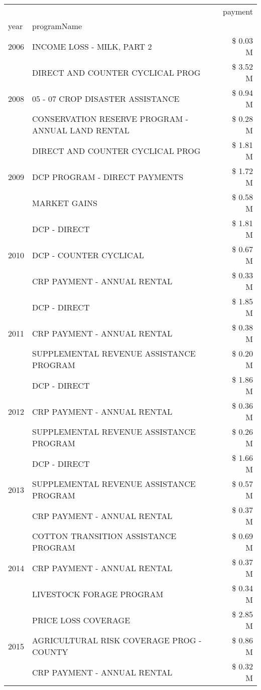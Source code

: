 \begin{tabular}{llr}
\toprule
 &  & payment \\
year & programName &  \\
\midrule
2006 & INCOME LOSS - MILK, PART 2 & \$ 0.03 M \\
\cline{1-3}
\multirow[t]{3}{*}{2008} & DIRECT AND COUNTER CYCLICAL PROG & \$ 3.52 M \\
 & 05 - 07 CROP DISASTER ASSISTANCE & \$ 0.94 M \\
 & CONSERVATION RESERVE PROGRAM - ANNUAL LAND RENTAL & \$ 0.28 M \\
\cline{1-3}
\multirow[t]{3}{*}{2009} & DIRECT AND COUNTER CYCLICAL PROG & \$ 1.81 M \\
 & DCP PROGRAM - DIRECT PAYMENTS & \$ 1.72 M \\
 & MARKET GAINS & \$ 0.58 M \\
\cline{1-3}
\multirow[t]{3}{*}{2010} & DCP - DIRECT & \$ 1.81 M \\
 & DCP - COUNTER CYCLICAL & \$ 0.67 M \\
 & CRP PAYMENT - ANNUAL RENTAL & \$ 0.33 M \\
\cline{1-3}
\multirow[t]{3}{*}{2011} & DCP - DIRECT & \$ 1.85 M \\
 & CRP PAYMENT - ANNUAL RENTAL & \$ 0.38 M \\
 & SUPPLEMENTAL REVENUE ASSISTANCE PROGRAM & \$ 0.20 M \\
\cline{1-3}
\multirow[t]{3}{*}{2012} & DCP - DIRECT & \$ 1.86 M \\
 & CRP PAYMENT - ANNUAL RENTAL & \$ 0.36 M \\
 & SUPPLEMENTAL REVENUE ASSISTANCE PROGRAM & \$ 0.26 M \\
\cline{1-3}
\multirow[t]{3}{*}{2013} & DCP - DIRECT & \$ 1.66 M \\
 & SUPPLEMENTAL REVENUE ASSISTANCE PROGRAM & \$ 0.57 M \\
 & CRP PAYMENT - ANNUAL RENTAL & \$ 0.37 M \\
\cline{1-3}
\multirow[t]{3}{*}{2014} & COTTON TRANSITION ASSISTANCE PROGRAM & \$ 0.69 M \\
 & CRP PAYMENT - ANNUAL RENTAL & \$ 0.37 M \\
 & LIVESTOCK FORAGE PROGRAM & \$ 0.34 M \\
\cline{1-3}
\multirow[t]{3}{*}{2015} & PRICE LOSS COVERAGE & \$ 2.85 M \\
 & AGRICULTURAL RISK COVERAGE PROG - COUNTY & \$ 0.86 M \\
 & CRP PAYMENT - ANNUAL RENTAL & \$ 0.32 M \\

\end{tabular}
